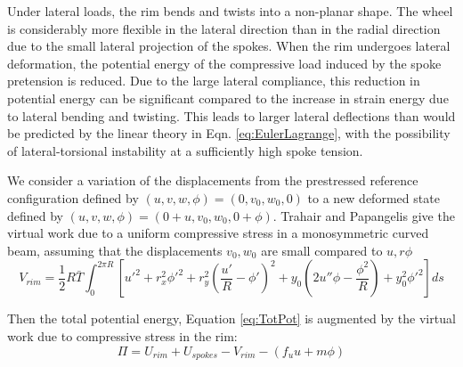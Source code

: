 \documentclass[\rootdir/thesis.tex]{subfiles}
\begin{document}
Under lateral loads, the rim bends and twists into a non-planar shape. The wheel is considerably more flexible in the lateral direction than in the radial direction due to the small lateral projection of the spokes. When the rim undergoes lateral deformation, the potential energy of the compressive load induced by the spoke pretension is reduced. Due to the large lateral compliance, this reduction in potential energy can be significant compared to the increase in strain energy due to lateral bending and twisting. This leads to larger lateral deflections than would be predicted by the linear theory in Eqn. \eqref{eq:EulerLagrange}, with the possibility of lateral-torsional instability at a sufficiently high spoke tension.

We consider a variation of the displacements from the prestressed reference configuration defined by $(u,v,w,\phi)=(0,v_0,w_0,0)$ to a new deformed state defined by $(u,v,w,\phi)=(0+u,v_0,w_0,0+\phi)$. Trahair and Papangelis\cite{Trahair} give the virtual work due to a uniform compressive stress in a monosymmetric curved beam, assuming that the displacements $v_0,w_0$ are small compared to $u,r\phi$
\begin{equation}
\label{eq:V_rim}
V_{rim} = \frac{1}{2}R\bar{T} \int_0^{2\pi R}
    \left[u'^2 + r_x^2\phi'^2+r_y^2\left(\frac{u'}{R}-\phi'\right)^2
          +y_0\left(2u''\phi-\frac{\phi^2}{R}\right) + y_0^2\phi'^2 \right] ds
\end{equation}

Then the total potential energy, Equation \ref{eq:TotPot} is augmented by the virtual work due to compressive stress in the rim:
\begin{equation}
\label{eq:TotPot_V}
\Pi = U_{rim} + U_{spokes} - V_{rim} - (f_uu+m\phi)
\end{equation}
\end{document}
